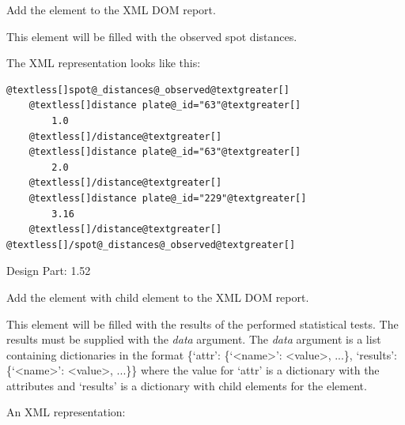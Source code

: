 \documentclass[letterpaper,10pt,english]{sphinxmanual}
\begin{document}
\begin{fulllineitems}

\begin{fulllineitems}
\label{setlyze/std:setlyze.std.ReportGenerator.set_spot_distances_observed}
Add the element  to the XML DOM
report.

This element will be filled with the observed spot distances.

The XML representation looks like this:

\begin{Verbatim}[commandchars=@\[\]]
@textless[]spot@_distances@_observed@textgreater[]
    @textless[]distance plate@_id="63"@textgreater[]
        1.0
    @textless[]/distance@textgreater[]
    @textless[]distance plate@_id="63"@textgreater[]
        2.0
    @textless[]/distance@textgreater[]
    @textless[]distance plate@_id="229"@textgreater[]
        3.16
    @textless[]/distance@textgreater[]
@textless[]/spot@_distances@_observed@textgreater[]
\end{Verbatim}

Design Part: 1.52

\end{fulllineitems}


\begin{fulllineitems}
\label{setlyze/std:setlyze.std.ReportGenerator.set_statistics}
Add the element  with child element
 to the XML DOM report.

This element will be filled with the results of the performed
statistical tests. The results must be supplied with the
\emph{data} argument. The \emph{data} argument is a list containing
dictionaries in the format \{`attr': \{`\textless{}name\textgreater{}': \textless{}value\textgreater{}, ...\},
`results': \{`\textless{}name\textgreater{}': \textless{}value\textgreater{}, ...\}\} where the value for `attr' is
a dictionary with the attributes and `results' is a dictionary
with child elements for the  element.

An XML representation:


\end{fulllineitems}
\end{fulllineitems}
\end{document}
